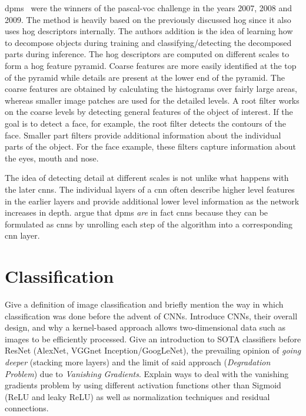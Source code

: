\documentclass[draft,final]{vutinfth} %
\begin{document}
\glspl{dpm}~\cite{felzenszwalb2008a} were the winners of the
\gls{pascal-voc} challenge in the years 2007, 2008 and 2009. The
method is heavily based on the previously discussed \gls{hog} since it
also uses \gls{hog} descriptors internally. The authors addition is
the idea of learning how to decompose objects during training and
classifying/detecting the decomposed parts during inference. The
\gls{hog} descriptors are computed on different scales to form a
\gls{hog} feature pyramid. Coarse features are more easily identified
at the top of the pyramid while details are present at the lower end
of the pyramid. The coarse features are obtained by calculating the
histograms over fairly large areas, whereas smaller image patches are
used for the detailed levels. A root filter works on the coarse levels
by detecting general features of the object of interest. If the goal
is to detect a face, for example, the root filter detects the contours
of the face. Smaller part filters provide additional information about
the individual parts of the object. For the face example, these
filters capture information about the eyes, mouth and nose.

The idea of detecting detail at different scales is not unlike what
happens with the later \glspl{cnn}. The individual layers of a
\gls{cnn} often describe higher level features in the earlier layers
and provide additional lower level information as the network
increases in depth. \textcite{girshick2015} argue that \glspl{dpm}
\emph{are} in fact \glspl{cnn} because they can be formulated as
\glspl{cnn} by unrolling each step of the algorithm into a
corresponding \gls{cnn} layer.


\section{Classification}
\label{sec:background-classification}

Give a definition of image classification and briefly mention the way
in which classification was done before the advent of CNNs. Introduce
CNNs, their overall design, and why a kernel-based approach allows
two-dimensional data such as images to be efficiently processed. Give
an introduction to SOTA classifiers before ResNet (AlexNet, VGGnet
Inception/GoogLeNet), the prevailing opinion of \emph{going deeper}
(stacking more layers) and the limit of said approach
(\emph{Degradation Problem}) due to \emph{Vanishing
Gradients}. Explain ways to deal with the vanishing gradients problem
by using different activation functions other than Sigmoid (ReLU and
leaky ReLU) as well as normalization techniques and residual
connections. 
\end{document}
